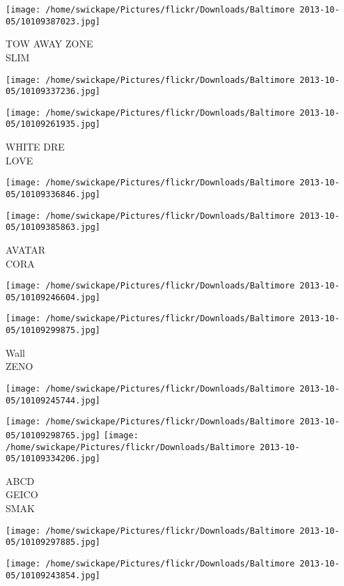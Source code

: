 \documentclass[10pt,letterpaper]{article}
\begin{document}
\vspace{0.25in}
\texttt{[image: /home/swickape/Pictures/flickr/Downloads/Baltimore 2013-10-05/10109387023.jpg]}

TOW AWAY ZONE\\
SLIM
\pagebreak

\texttt{[image: /home/swickape/Pictures/flickr/Downloads/Baltimore 2013-10-05/10109337236.jpg]}

\vspace{0.25in}
\texttt{[image: /home/swickape/Pictures/flickr/Downloads/Baltimore 2013-10-05/10109261935.jpg]}

WHITE DRE\\
LOVE
\pagebreak

\texttt{[image: /home/swickape/Pictures/flickr/Downloads/Baltimore 2013-10-05/10109336846.jpg]}

\vspace{0.25in}
\texttt{[image: /home/swickape/Pictures/flickr/Downloads/Baltimore 2013-10-05/10109385863.jpg]}

AVATAR\\
CORA
\pagebreak

\texttt{[image: /home/swickape/Pictures/flickr/Downloads/Baltimore 2013-10-05/10109246604.jpg]}

\vspace{0.25in}
\texttt{[image: /home/swickape/Pictures/flickr/Downloads/Baltimore 2013-10-05/10109299875.jpg]}

Wall\\
ZENO
\pagebreak

\texttt{[image: /home/swickape/Pictures/flickr/Downloads/Baltimore 2013-10-05/10109245744.jpg]}

\vspace{0.25in}
\texttt{[image: /home/swickape/Pictures/flickr/Downloads/Baltimore 2013-10-05/10109298765.jpg]}
\texttt{[image: /home/swickape/Pictures/flickr/Downloads/Baltimore 2013-10-05/10109334206.jpg]}

ABCD\\
GEICO\\
SMAK
\pagebreak

\texttt{[image: /home/swickape/Pictures/flickr/Downloads/Baltimore 2013-10-05/10109297885.jpg]}

\vspace{0.25in}
\texttt{[image: /home/swickape/Pictures/flickr/Downloads/Baltimore 2013-10-05/10109243854.jpg]}
\end{document}
